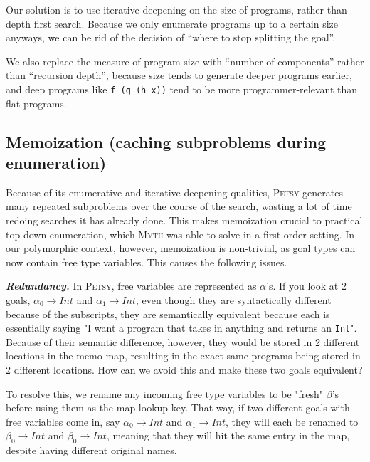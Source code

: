 \documentclass[acmsmall,nonacm]{acmart}
\begin{document}
Our solution is to use iterative deepening on the size of programs, 
rather than depth first search. Because we only enumerate programs up 
to a certain size anyways, we can be rid of the decision of ``where to 
stop splitting the goal''.

We also replace the measure of program size with ``number of components'' 
rather than ``recursion depth'', because size tends to generate deeper 
programs earlier, and deep programs like \texttt{f (g (h x))} tend to 
be more programmer-relevant than flat programs.



\subsection{Memoization (caching subproblems during enumeration)}

Because of its enumerative and iterative deepening qualities, \textsc{Petsy} 
generates many repeated subproblems
over the course of the search, wasting a lot of time redoing searches it has
already done. This makes memoization crucial to practical 
top-down enumeration, which \textsc{Myth} \cite{myth} was able to solve in a 
first-order setting.
In our polymorphic context, however, memoization is non-trivial, as goal types can now contain free 
type variables. This causes the following issues.

\vspace{2mm}
\noindent \textbf{\textit{Redundancy.}} In \textsc{Petsy}, free variables 
are represented as $\alpha$'s. If you look at 2 goals, $\alpha_0 \to Int$ 
and $\alpha_1 \to Int$, even though they are syntactically different because of the subscripts,
they are semantically equivalent because each is essentially saying "I want 
a program that takes in anything and returns an \texttt{Int}". Because 
of their semantic difference, however, they would be stored in 2 different 
locations in the memo map, resulting in the exact same programs being stored
in 2 different locations. 
How can we avoid this and make these two goals equivalent?

To resolve this, we rename any incoming free type variables 
to be "fresh" $\beta$'s before using them as the map lookup key. That way, if 
two different goals with free variables come in, say $\alpha_0 \to Int$ and 
$\alpha_1 \to Int$, they will each be renamed to $\beta_0 \to Int$ 
and $\beta_0 \to Int$, meaning that they will hit the same entry in the map,
despite having different original names.
\end{document}
